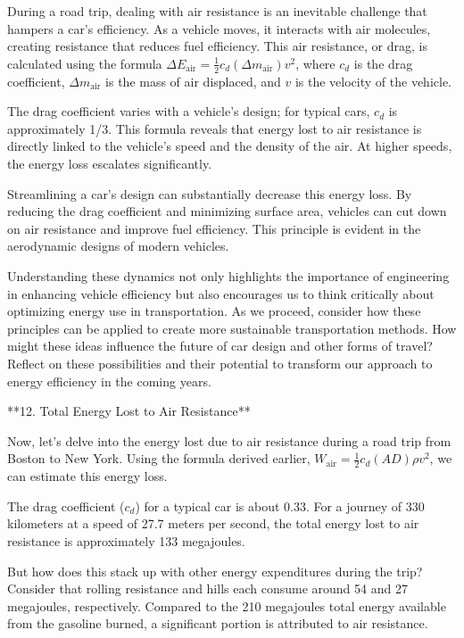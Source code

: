 \begin{tcolorbox}[size=title,opacityfill=0.05,breakable]
During a road trip, dealing with air resistance is an inevitable challenge that hampers a car's efficiency. As a vehicle moves, it interacts with air molecules, creating resistance that reduces fuel efficiency. This air resistance, or drag, is calculated using the formula \( \Delta E_{\text{air}} = \frac{1}{2} c_d (\Delta m_{\text{air}}) v^2 \), where \( c_d \) is the drag coefficient, \( \Delta m_{\text{air}} \) is the mass of air displaced, and \( v \) is the velocity of the vehicle. 

The drag coefficient varies with a vehicle's design; for typical cars, \( c_d \) is approximately 1/3. This formula reveals that energy lost to air resistance is directly linked to the vehicle's speed and the density of the air. At higher speeds, the energy loss escalates significantly.

Streamlining a car's design can substantially decrease this energy loss. By reducing the drag coefficient and minimizing surface area, vehicles can cut down on air resistance and improve fuel efficiency. This principle is evident in the aerodynamic designs of modern vehicles.

Understanding these dynamics not only highlights the importance of engineering in enhancing vehicle efficiency but also encourages us to think critically about optimizing energy use in transportation. As we proceed, consider how these principles can be applied to create more sustainable transportation methods. How might these ideas influence the future of car design and other forms of travel? Reflect on these possibilities and their potential to transform our approach to energy efficiency in the coming years.

**12. Total Energy Lost to Air Resistance**

Now, let's delve into the energy lost due to air resistance during a road trip from Boston to New York. Using the formula derived earlier, \( W_{\text{air}} = \frac{1}{2} c_d (AD) \rho v^2 \), we can estimate this energy loss. 

The drag coefficient (\( c_d \)) for a typical car is about 0.33. For a journey of 330 kilometers at a speed of 27.7 meters per second, the total energy lost to air resistance is approximately 133 megajoules. 

But how does this stack up with other energy expenditures during the trip? Consider that rolling resistance and hills each consume around 54 and 27 megajoules, respectively. Compared to the 210 megajoules total energy available from the gasoline burned, a significant portion is attributed to air resistance.


\end{tcolorbox}
